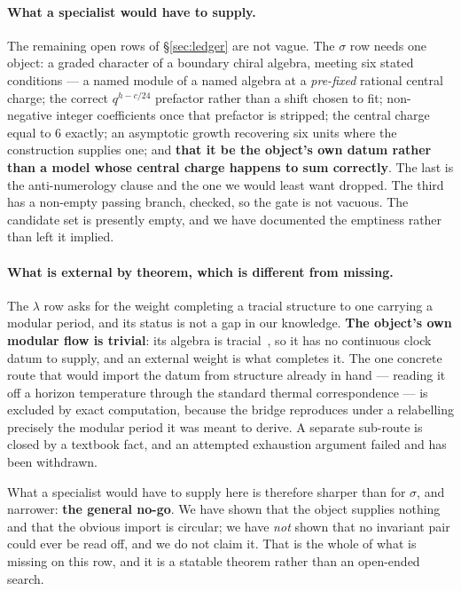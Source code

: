 \documentclass[11pt,a4paper]{article}
\theoremstyle{definition}
\theoremstyle{remark}
\begin{document}
\paragraph{What a specialist would have to supply.} The remaining open rows of
\S\ref{sec:ledger} are not vague. The $\sigma$ row needs one object: a graded character of a boundary
chiral algebra, meeting six stated conditions --- a named module of a named algebra at a
\emph{pre-fixed} rational central charge; the correct $q^{h-c/24}$ prefactor rather than a shift
chosen to fit; non-negative integer coefficients once that prefactor is stripped; the central charge
equal to $6$ exactly; an asymptotic growth recovering six units where the construction supplies one;
and \textbf{that it be the object's own datum rather than a model whose central charge happens to
sum correctly}. The last is the anti-numerology clause and the one we would least want dropped.
The third has a non-empty passing branch, checked, so the gate is not vacuous. The
candidate set is presently empty, and we have documented the emptiness rather than left it implied.

\paragraph{What is external by theorem, which is different from missing.} The $\lambda$ row asks
for the weight completing a tracial structure to one carrying a modular period, and its status is
not a gap in our knowledge. \textbf{The object's own modular flow is trivial}: its algebra is
tracial~\cite{cr,connes}, so it has no continuous clock datum to supply, and an external weight is what completes it.
The one concrete route that would import the datum from structure already in hand --- reading it off
a horizon temperature through the standard thermal correspondence --- is excluded by exact
computation, because the bridge reproduces under a relabelling precisely the modular period it was
meant to derive. A separate sub-route is closed by a textbook fact, and an attempted exhaustion
argument failed and has been withdrawn.

What a specialist would have to supply here is therefore sharper than for $\sigma$, and narrower:
\textbf{the general no-go}. We have shown that the object supplies nothing and that the obvious
import is circular; we have \emph{not} shown that no invariant pair could ever be read off, and we
do not claim it. That is the whole of what is missing on this row, and it is a statable theorem
rather than an open-ended search.
\end{document}
